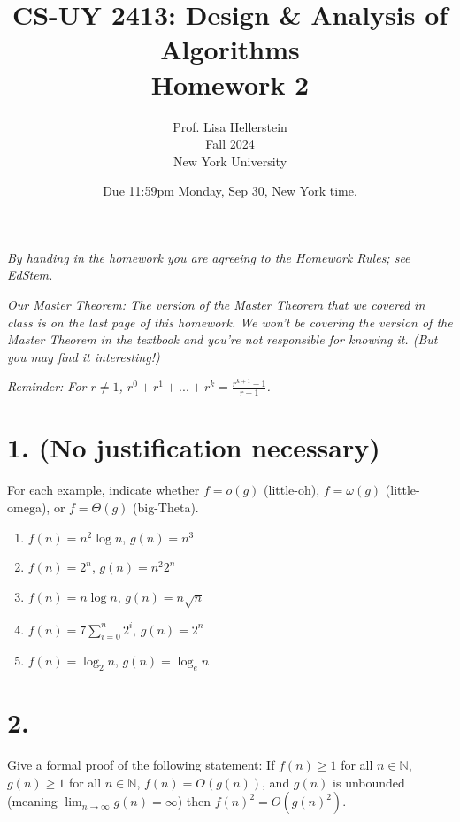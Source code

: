 \documentclass{article}
\begin{document}
\title{CS-UY 2413: Design \& Analysis of Algorithms \\ Homework 2}
\author{Prof. Lisa Hellerstein \\ Fall 2024 \\ New York University}
\date{Due 11:59pm Monday, Sep 30, New York time.}
\maketitle

\textit{By handing in the homework you are agreeing to the Homework Rules; see EdStem.}

\textit{Our Master Theorem: The version of the Master Theorem that we covered in class is on the last page of this homework. We won’t be covering the version of the Master Theorem in the textbook and you’re not responsible for knowing it. (But you may find it interesting!)}

\textit{Reminder: For $r \neq 1$, $r^0 + r^1 + ... + r^k = \frac{r^{k+1} - 1}{r - 1}$.}



\section*{1. (No justification necessary)}
For each example, indicate whether $f = o(g)$ (little-oh), $f = \omega(g)$ (little-omega), or $f = \Theta(g)$ (big-Theta).

\begin{enumerate}[label=(\alph*)]
    \item $f(n) = n^2 \log n$, $g(n) = n^3$
    \item $f(n) = 2^n$, $g(n) = n^2 2^n$
    \item $f(n) = n \log n$, $g(n) = n \sqrt{n}$
    \item $f(n) = 7 \sum_{i=0}^n 2^i$, $g(n) = 2^n$
    \item $f(n) = \log_2 n$, $g(n) = \log_e n$
\end{enumerate}



\section*{2.}
Give a formal proof of the following statement: If $f(n) \ge 1$ for all $n \in \mathbb{N}$, $g(n) \ge 1$ for all $n \in \mathbb{N}$, $f(n) = O(g(n))$, and $g(n)$ is unbounded (meaning $\lim_{n \to \infty} g(n) = \infty$) then $f(n)^2 = O(g(n)^2)$.
\end{document}
